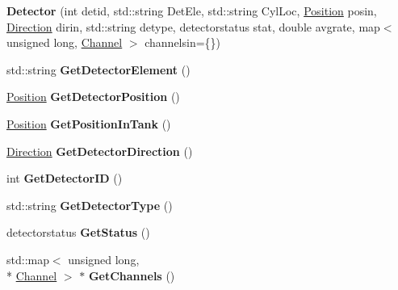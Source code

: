 \begin{DoxyCompactItemize}
\item 
\hypertarget{classDetector_acc63b0828ae0a8fecca2f71b26f14531}{{\bfseries Detector} (int detid, std\-::string Det\-Ele, std\-::string Cyl\-Loc, \hyperlink{classPosition}{Position} posin, \hyperlink{classDirection}{Direction} dirin, std\-::string detype, detectorstatus stat, double avgrate, map$<$ unsigned long, \hyperlink{classChannel}{Channel} $>$ channelsin=\{\})}\label{classDetector_acc63b0828ae0a8fecca2f71b26f14531}

\item 
\hypertarget{classDetector_a7622dcc0d32a77b2d81f3346f9d486a6}{std\-::string {\bfseries Get\-Detector\-Element} ()}\label{classDetector_a7622dcc0d32a77b2d81f3346f9d486a6}

\item 
\hypertarget{classDetector_ae706947ab25223c2707b0b04fa1cf999}{\hyperlink{classPosition}{Position} {\bfseries Get\-Detector\-Position} ()}\label{classDetector_ae706947ab25223c2707b0b04fa1cf999}

\item 
\hypertarget{classDetector_ace3843de946676dac6a031ab21ab2537}{\hyperlink{classPosition}{Position} {\bfseries Get\-Position\-In\-Tank} ()}\label{classDetector_ace3843de946676dac6a031ab21ab2537}

\item 
\hypertarget{classDetector_a80cbd9a7402579d601953a91d6883a94}{\hyperlink{classDirection}{Direction} {\bfseries Get\-Detector\-Direction} ()}\label{classDetector_a80cbd9a7402579d601953a91d6883a94}

\item 
\hypertarget{classDetector_a85412b023bb48b28e27c9b308857653f}{int {\bfseries Get\-Detector\-I\-D} ()}\label{classDetector_a85412b023bb48b28e27c9b308857653f}

\item 
\hypertarget{classDetector_a0f5e4f78e6e64903f46679577609a320}{std\-::string {\bfseries Get\-Detector\-Type} ()}\label{classDetector_a0f5e4f78e6e64903f46679577609a320}

\item 
\hypertarget{classDetector_adf81db079151a065407d44558a6240b3}{detectorstatus {\bfseries Get\-Status} ()}\label{classDetector_adf81db079151a065407d44558a6240b3}

\item 
\hypertarget{classDetector_a1aa42e2f99fd99f2b09d2ab0a1ff4405}{std\-::map$<$ unsigned long, \\*
\hyperlink{classChannel}{Channel} $>$ $\ast$ {\bfseries Get\-Channels} ()}\label{classDetector_a1aa42e2f99fd99f2b09d2ab0a1ff4405}


\end{DoxyCompactItemize}
